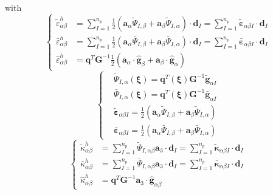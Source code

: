 with
\begin{equation}\label{epsilon2}
\left \{
\begin{split}
\tilde \varepsilon^h_{\alpha\beta} &= \sum_{I=1}^{n_p} \frac{1}{2}(\boldsymbol a_\alpha \tilde \Psi_{I,\beta} + \boldsymbol a_\beta \tilde \Psi_{I,\alpha}) \cdot \boldsymbol d_I
=\sum_{I=1}^{n_p} \tilde{\boldsymbol \varepsilon}_{\alpha\beta I} \cdot \boldsymbol d_I \\
\bar \varepsilon^h_{\alpha\beta} &= \sum_{I=1}^{n_p} \frac{1}{2}(\boldsymbol a_\alpha \bar \Psi_{I,\beta} + \boldsymbol a_\beta \bar \Psi_{I,\alpha}) \cdot \boldsymbol d_I
=\sum_{I=1}^{n_p} \bar{\boldsymbol \varepsilon}_{\alpha\beta I} \cdot \boldsymbol d_I \\
\hat \varepsilon^h_{\alpha\beta} &= \boldsymbol q^T \boldsymbol G^{-1} \frac{1}{2}(\boldsymbol a_\alpha\cdot\hat{\boldsymbol g}_\beta + \boldsymbol a_\beta \cdot \hat{\boldsymbol g}_\alpha)
\end{split}
\right .
\end{equation}
\begin{equation}
\left \{
\begin{split}
&\tilde{\Psi}_{I,\alpha}(\boldsymbol \xi) = \boldsymbol q^T(\boldsymbol \xi) \boldsymbol G^{-1} \tilde{\boldsymbol g}_{\alpha I} \\
&\bar{\Psi}_{I,\alpha}(\boldsymbol \xi) = \boldsymbol q^T(\boldsymbol \xi) \boldsymbol G^{-1} \bar{\boldsymbol g}_{\alpha I} \\
&\tilde{\boldsymbol \varepsilon}_{\alpha\beta I} = \frac{1}{2}(\boldsymbol a_\alpha \tilde \Psi_{I,\beta} + \boldsymbol a_\beta \tilde \Psi_{I,\alpha}) \\
&\bar{\boldsymbol \varepsilon}_{\alpha\beta I} = \frac{1}{2}(\boldsymbol a_\alpha \bar \Psi_{I,\beta} + \boldsymbol a_\beta \bar \Psi_{I,\alpha})
\end{split}
\right .
\end{equation}
\begin{equation}\label{kappa2}
\left \{
\begin{split}
\tilde \kappa^h_{\alpha\beta} &= \sum_{I=1}^{n_p} \tilde \Psi_{I,\alpha\beta}\boldsymbol a_3 \cdot \boldsymbol d_I 
= \sum_{I = 1}^{n_p} \tilde{\boldsymbol \kappa}_{\alpha\beta I} \cdot \boldsymbol d_I\\
\bar \kappa^h_{\alpha\beta} &= \sum_{I=1}^{n_p} \bar \Psi_{I,\alpha\beta}\boldsymbol a_3 \cdot \boldsymbol d_I
= \sum_{I = 1}^{n_p} \bar{\boldsymbol \kappa}_{\alpha\beta I} \cdot \boldsymbol d_I \\
\hat \kappa^h_{\alpha\beta} &= \boldsymbol q^T \boldsymbol G^{-1} \boldsymbol a_3 \cdot \hat{\boldsymbol g}_{\alpha\beta}
\end{split}
\right .
\end{equation}
